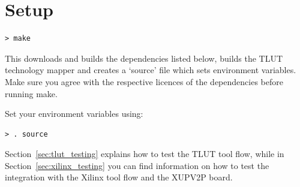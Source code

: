 \documentclass[a4paper,oneside]{memoir}
\begin{document}
\clearpage
\chapter{Setup}\label{sec:setup}
\begin{lstlisting}
> make
\end{lstlisting}
This downloads and builds the dependencies listed below, builds the TLUT technology mapper and creates a `source' file which sets environment variables. 
Make sure you agree with the respective licences of the dependencies before running make. 

Set your environment variables using:
\begin{lstlisting}
> . source
\end{lstlisting}

Section~\ref{sec:tlut_testing} explains how to test the TLUT tool flow, while in Section~\ref{sec:xilinx_testing} you can find information on how to test the integration with the Xilinx tool flow and the XUPV2P board.
\end{document}
